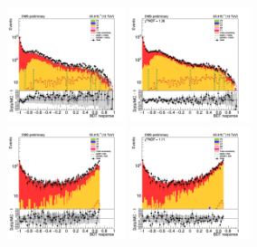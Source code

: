 \begin{figure}[tbp]                                                                                                                                                       
  \begin{center}                                                                                                                                                          
    \includegraphics[width=0.31\textwidth]{figures/mm_300_april18/bdt_response_mm_CRDY_prefit_plot_apr18.png}                                                             
    \includegraphics[width=0.31\textwidth]{figures/mm_300_april18/bdt_response_mm_CRDY_FullPostfit_plot_apr18.png}\\                                                      
    \includegraphics[width=0.31\textwidth]{figures/mm_300_april18/mm_300_good_SR_bdt_sideBand_april18/bdt_response_afterCut_mm_SR_prefit_plot_apr18.png}                  
    \includegraphics[width=0.31\textwidth]{figures/mm_300_april18/mm_300_good_SR_bdt_sideBand_april18/bdt_response_afterCut_mm_SR_FullPostfit_plot_apr18.png}\\           

\end{center}
\end{figure}
